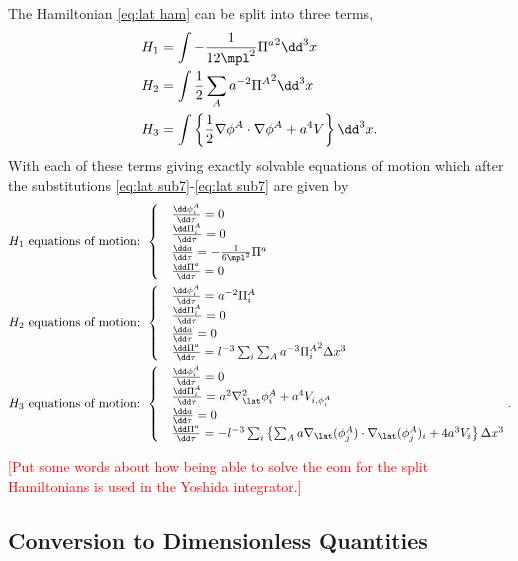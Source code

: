 The Hamiltonian \eqref{eq:lat ham} can be split into three terms,
\begin{align} 
  & H_1 = \int-\frac{1}{12\mpl^2}{\Pi^a}^2\dd^3x  \label{eq:ham split1}  \\
  & H_2 = \int\frac{1}{2}\sum_Aa^{-2}{\Pi^A}^2\dd^3x  \label{eq:ham split2}  \\
  & H_3 = \int\left\{\frac{1}{2}\nabla\phi^A\cdot\nabla\phi^A + a^4V\right\}\dd^3x. \label{eq:ham split3}
\end{align}
With each of these terms giving exactly solvable equations of motion which after the substitutions \eqref{eq:lat sub7}-\eqref{eq:lat sub7} are given by
\begin{align}
  H_1 \text{ equations of motion: }
  & \begin{cases}
      & \frac{\dd\phi^A_i}{\dd\tau} = 0 \\
      & \frac{\dd\Pi^A_i}{\dd\tau} = 0 \\
      & \frac{\dd a}{\dd\tau} = -\frac{1}{6\mpl^2}\Pi^a \\
      & \frac{\dd\Pi^a}{\dd\tau} = 0
    \end{cases} \\
  H_2 \text{ equations of motion: }
  & \begin{cases}
      & \frac{\dd\phi^A_i}{\dd\tau} = a^{-2}\Pi^A_i \\
      & \frac{\dd\Pi^A_i}{\dd\tau} = 0 \\
      & \frac{\dd a}{\dd\tau} = 0 \\
      & \frac{\dd\Pi^a}{\dd\tau} = l^{-3}\sum_i\sum_Aa^{-3}{\Pi^A_i}^2\Delta x^3
    \end{cases} \\
  H_3 \text{ equations of motion: }
  & \begin{cases}
      & \frac{\dd\phi^A_i}{\dd\tau} = 0 \\
      & \frac{\dd\Pi^A_i}{\dd\tau} = a^2\nabla^2_\lat\phi^A_i + a^4V_{i,\phi^A_i} \\
      & \frac{\dd a}{\dd\tau} = 0 \\
      & \frac{\dd\Pi^a}{\dd\tau} = -l^{-3}\sum_i\left\{
      \sum_Aa\nabla_\lat(\phi^A_j)\cdot\nabla_\lat(\phi^A_j)_i +4a^3V_i
      \right\}\Delta x^3
    \end{cases}.
\end{align}

\textcolor{red}{[Put some words about how being able to solve the eom for the split Hamiltonians is used in the Yoshida integrator.]}

\subsection{Conversion to Dimensionless Quantities}
